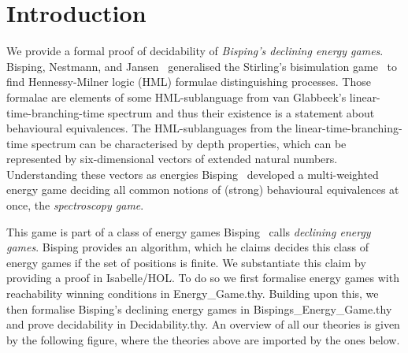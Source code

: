 \newpage
\section{Introduction}
 
\noindent
We provide a formal proof of decidability of \textit{Bisping's declining energy games}. 
Bisping, Nestmann, and Jansen~\cite{bispingNestmann,bispingJansenNestmann} generalised the 
Stirling's bisimulation game~\cite{stirling-bisim} to find Hennessy-Milner logic (HML) formulae distinguishing 
processes. Those formalae are elements of some HML-sublanguage from 
van Glabbeek’s linear-time-branching-time spectrum\cite{vanGlabbeek} 
and thus their existence is a statement about behavioural equivalences.
The HML-sublanguages from the linear-time-branching-time spectrum can be characterised by depth properties, 
which can be represented by six-dimensional vectors of extended natural numbers. Understanding these 
vectors as energies Bisping~\cite{bens-algo} developed a multi-weighted energy game deciding all common 
notions of (strong) behavioural equivalences at once, the \textit{spectroscopy game}. 

This game is part of a class of energy games Bisping~\cite{bens-algo} calls \textit{declining energy games}.
Bisping provides an algorithm, which he claims decides this class of energy games if the set of positions is finite.
We substantiate this claim by providing a proof in Isabelle/HOL.
To do so we first formalise energy games with reachability winning conditions in Energy\_Game.thy. 
Building upon this, we then formalise Bisping's declining energy games in Bispings\_Energy\_Game.thy and prove decidability in Decidability.thy.
An overview of all our theories is given by the following figure, where the theories above are imported by the ones below.


